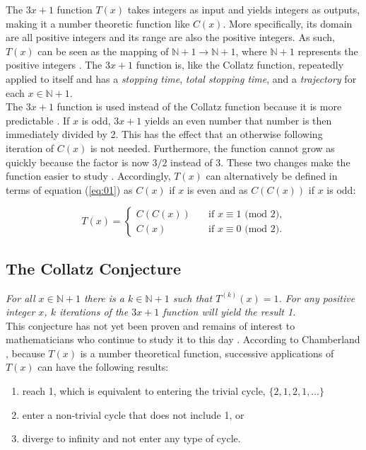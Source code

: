 \documentclass[12pt,a4paper,reqno]{amsart}
\begin{document}
The $3x+1$ function $T(x)$ 
takes integers as input and yields integers as outputs, making it a number
theoretic function like $C(x)$. More specifically, its
domain are all positive integers and its range are also the positive integers.
As such, $T(x)$ can be seen as the mapping of 
$\mathbb{N} + 1 \rightarrow \mathbb{N} + 1$, where $\mathbb{N} + 1$ represents
the positive integers \cite{src:04}. The $3x+1$ 
function is, like the Collatz function, repeatedly applied to itself and has 
a \textit{stopping time}, \textit{total stopping time}, and a 
\textit{trajectory} for each $x \in \mathbb{N} + 1$. \\
The $3x+1$ function is used instead of the Collatz function because it is more 
predictable \cite{src:03}. 
If $x$ is odd, $3x+1$ yields an even number that number is then 
immediately divided by 2. This has the effect that an otherwise following
iteration of $C(x)$ is not needed. Furthermore, the function cannot grow as
quickly because the factor is now $3/2$ instead of 3. These two changes make
the function easier to study \cite{src:03}.
Accordingly, $T(x)$ can alternatively be defined in terms of equation 
(\ref{eq:01}) as $C(x)$ if $x$ is even and as $C(C(x))$ if $x$ is odd:

\begin{equation}
T(x)= \left\{
\nonumber
    \begin{array}{ll}
        C(C(x))\quad &\text{if } x \equiv 1 \text{ (mod 2),} \\
        C(x) \quad &\text{if } x \equiv 0 \text{ (mod 2).}
    \end{array}
\right.
\label{eq:03}
\end{equation}

\subsection{The Collatz Conjecture}

\textit{For all $x \in \mathbb{N} + 1$ there is a $k \in \mathbb{N} + 1$ such 
that $T^{(k)}(x)=1$. For any positive integer $x$, $k$ iterations of the $3x+1$ 
function will yield the result 1.} \\
This conjecture has not yet been proven and remains of interest to
mathematicians who continue to study it to this day \cite{src:03}. According to 
Chamberland \cite{src:02}, because $T(x)$ is a number theoretical function, 
successive applications of $T(x)$ can have the following results:

\begin{enumerate}
    \item reach 1, which is equivalent to entering the trivial cycle,
        $\{2,1,2,1,\dots\}$
    \item enter a non-trivial cycle that does not include 1, or
    \item diverge to infinity and not enter any type of cycle.
\end{enumerate}
\end{document}
